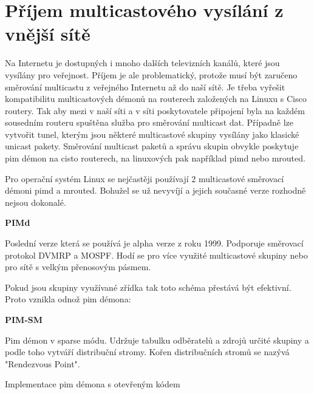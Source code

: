 \chapter{Příjem multicastového vysílání z vnější sítě}

Na Internetu je dostupných i mnoho dalších televizních kanálů, které jsou vysílány pro veřejnost. Příjem je ale problematický, protože musí být zaručeno směrování multicastu z veřejného Internetu až do naší sítě. Je třeba vyřešit kompatibilitu multicastových démonů na routerech založených na Linuxu s Cisco routery. Tak aby mezi v naší síti a v síti poskytovatele připojení byla na každém sousedním routeru spuštěna služba pro směrování multicast dat. Případně lze vytvořit tunel, kterým jsou některé multicastové skupiny vysílány jako klasické unicast pakety. Směrování multicast paketů a správu skupin obvykle poskytuje pim démon na cisto routerech, na linuxových pak například pimd nebo mrouted.

\vspace{10pt}

Pro operační systém Linux se nejčastěji používají 2 multicastové směrovací démoni pimd a mrouted. Bohužel se už nevyvíjí a jejich současné verze rozhodně nejsou dokonalé.

\vspace{10pt}

\textbf{PIMd}

\vspace{5pt}

Poslední verze která se používá je alpha verze z roku 1999. Podporuje směrovací protokol DVMRP a MOSPF. Hodí se pro více využité multicastové skupiny nebo pro sítě s velkým přenosovým pásmem.

\vspace{10pt}

Pokud jsou skupiny využívané zřídka tak toto schéma přestává být efektivní. Proto vznikla odnož pim démona:

\vspace{10pt}

\textbf{PIM-SM}

\vspace{5pt}

Pim démon v sparse módu. Udržuje tabulku odběratelů a zdrojů určité skupiny a podle toho vytváří distribuční stromy. Kořen distribučních stromů se nazývá "Rendezvous Point".

\vspace{10pt}

Implementace pim démona s otevřeným kódem

